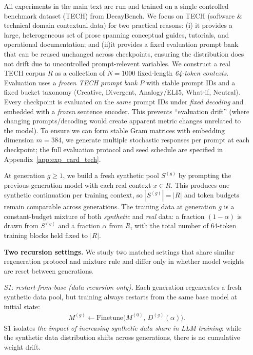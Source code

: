 \documentclass{article}
\theoremstyle{plain}
\theoremstyle{definition}
\theoremstyle{remark}
\begin{document}
All experiments in the main text are run and trained on a single controlled benchmark dataset (\textsc{TECH})  from DecayBench. We focus on TECH (software \& technical domain contextual data) for two practical reasons: (i) it provides a large, heterogeneous set of prose spanning conceptual guides, tutorials, and operational documentation; and (ii)it provides a fixed evaluation prompt bank that can be reused unchanged across checkpoints, ensuring the distribution does not drift due to uncontrolled prompt-relevent variables. We construct a real TECH corpus $R$ as a collection of $N=1000$ fixed-length \emph{64-token contexts}. 
 Evaluation uses a \emph{frozen TECH prompt bank} $P$ with stable prompt IDs and a fixed bucket taxonomy (Creative, Divergent, Analogy/ELI5, What-if, Neutral). Every checkpoint is evaluated on the \emph{same} prompt IDs under \emph{fixed decoding} and embedded with a \emph{frozen} sentence encoder. This prevents “evaluation drift” (where changing prompts/decoding would create apparent metric changes unrelated to the model). To ensure we can form stable Gram matrices with embedding dimension $m=384$, we generate multiple stochastic responses per prompt at each checkpoint; the full evaluation protocol and seed schedule are specified in Appendix~\ref{app:exp_card_tech}.

\smallskip

At generation $g\ge 1$, we build a fresh synthetic pool $S^{(g)}$ by prompting the previous-generation model with each real context $x\in R$.  This produces one synthetic continuation per training context, so $|S^{(g)}|=|R|$ and token budgets remain comparable across generations. The training data at generation $g$ is a constant-budget mixture
of both \emph{synthetic} and \emph{real} data: a fraction $(1-\alpha)$ is drawn from $S^{(g)}$ and a fraction $\alpha$ from $R$, with the total number of 64-token training blocks held fixed to $|R|$.

\smallskip
\noindent\textbf{Two recursion settings.}
We study two matched settings that share similar regeneration protocol and mixture rule and differ only in whether model weights are reset between generations.

\emph{S1: restart-from-base (data recursion only).}
Each generation regenerates a fresh synthetic data pool, but training always restarts from the same base model at initial state:
\begin{align}
    M^{(g)} \leftarrow \mathrm{Finetune} \big(M^{(0)},\, D^{(g)}(\alpha)\big).
\end{align}
S1 isolates \emph{the impact of increasing synthetic data share in LLM training}: while the synthetic data distribution shifts across generations, there is no cumulative weight drift.
\end{document}
